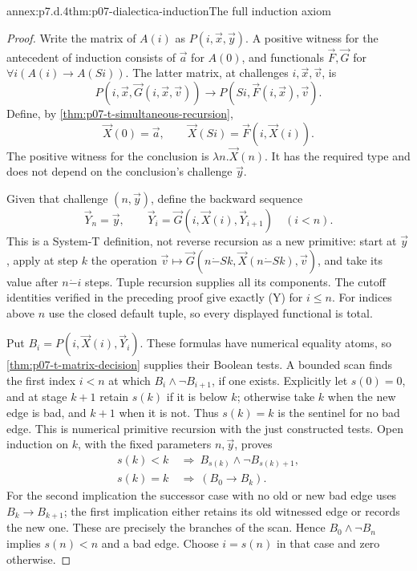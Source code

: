 \begin{annexitem}{annex:p7.d.4}{thm:p07-dialectica-induction}{The full induction axiom}
\begin{proof}
Write the matrix of \(A(i)\) as \(P(i,\vec x,\vec y)\).
A positive witness for the antecedent of induction consists of
\(\vec a\) for \(A(0)\), and functionals \(\vec F,\vec G\)
for \(\forall i(A(i)\to A(Si))\). The latter matrix, at challenges
\(i,\vec x,\vec v\), is
\[
 P(i,\vec x,\vec G(i,\vec x,\vec v))\longrightarrow
 P(Si,\vec F(i,\vec x),\vec v).
 \tag{I}
\]
Define, by \cref{thm:p07-t-simultaneous-recursion},
\[
 \vec X(0)=\vec a,\qquad
 \vec X(Si)=\vec F(i,\vec X(i)).
\]
The positive witness for the conclusion is \(\lambda n.\vec X(n)\).
It has the required type and does not depend on the conclusion's
challenge \(\vec y\).

Given that challenge \((n,\vec y)\), define the backward sequence
\[
 \vec Y_n=\vec y,\qquad
 \vec Y_i=\vec G(i,\vec X(i),\vec Y_{i+1})\quad(i<n).
 \tag{Y}
\]
This is a System-T definition, not reverse recursion as a new primitive:
start at \(\vec y\), apply at step \(k\) the operation
\(\vec v\mapsto\vec G(n\mathbin{\dot{-}}Sk,
\vec X(n\mathbin{\dot{-}}Sk),\vec v)\), and take its value
after \(n\mathbin{\dot{-}}i\) steps. Tuple recursion supplies
all its components. The cutoff identities verified in the preceding
proof give exactly (Y) for \(i\leq n\). For indices above \(n\)
use the closed default tuple, so every displayed functional is total.

Put \(B_i=P(i,\vec X(i),\vec Y_i)\). These formulas have numerical
equality atoms, so \cref{thm:p07-t-matrix-decision} supplies their
Boolean tests. A bounded scan finds the first index \(i<n\) at
which \(B_i\land\neg B_{i+1}\), if one exists. Explicitly let
\(s(0)=0\), and at stage \(k+1\) retain \(s(k)\) if it is below
\(k\); otherwise take \(k\) when the new edge is bad, and \(k+1\)
when it is not. Thus \(s(k)=k\) is the sentinel for no bad edge.
This is numerical primitive recursion with the just constructed tests.
Open induction on \(k\), with the fixed parameters \(n,\vec y\),
proves
\[
\begin{split}
 s(k)<k&\ \Longrightarrow\ B_{s(k)}\land\neg B_{s(k)+1},\\
 s(k)=k&\ \Longrightarrow\ (B_0\to B_k).
\end{split}
\]
For the second implication the successor case with no old or new bad
edge uses \(B_k\to B_{k+1}\); the first implication either retains
its old witnessed edge or records the new one. These are precisely
the branches of the scan. Hence \(B_0\land\neg B_n\) implies
\(s(n)<n\) and a bad edge. Choose \(i=s(n)\) in that case and
zero otherwise.


\end{proof}
\end{annexitem}
